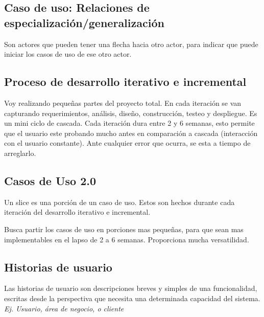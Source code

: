 \documentclass[titlepage,a4paper]{article}
\begin{document}
\subsection{Caso de uso: Relaciones de especialización/generalización}
Son actores que pueden tener una flecha hacia otro actor, para indicar que puede iniciar los casos de uso de ese otro actor.

\subsection{Proceso de desarrollo iterativo e incremental}\label{sec:procesoIterativoIncremental}
Voy realizando pequeñas partes del proyecto total. En cada iteración se van capturando requerimientos, análisis, diseño, construcción, testeo y despliegue. Es un mini ciclo de cascada. Cada iteración dura entre 2 y 6 semanas, esto permite que el usuario este probando mucho antes en comparación a cascada (interacción con el usuario constante). Ante cualquier error que ocurra, se esta a tiempo de arreglarlo.

\subsection{Casos de Uso 2.0}
Un slice es una porción de un caso de uso. Estos son hechos durante cada iteración del desarrollo iterativo e incremental.

Busca partir los casos de uso en porciones mas pequeñas, para que sean mas implementables en el lapso de 2 a 6 semanas. Proporciona mucha versatilidad.

\subsection{Historias de usuario}
Las historias de usuario son descripciones breves y simples de una funcionalidad, escritas desde la perspectiva que necesita una determinada capacidad del sistema. \textit{Ej. Usuario, área de negocio, o cliente}
\end{document}
